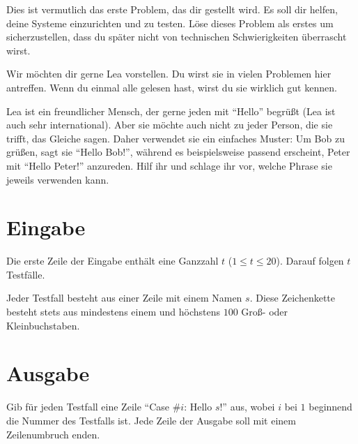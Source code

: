 

Dies ist vermutlich das erste Problem, das dir gestellt wird. Es soll dir helfen, deine Systeme einzurichten und zu testen. Löse dieses Problem als erstes um sicherzustellen, dass du später nicht von technischen Schwierigkeiten überrascht wirst.

Wir möchten dir gerne Lea vorstellen. Du wirst sie in vielen Problemen hier antreffen. Wenn du einmal alle gelesen hast, wirst du sie wirklich gut kennen.

Lea ist ein freundlicher Mensch, der gerne jeden mit ``Hello'' begrüßt (Lea ist auch sehr international). Aber sie möchte auch nicht zu jeder Person, die sie trifft, das Gleiche sagen. Daher verwendet sie ein einfaches Muster: Um Bob zu grüßen, sagt sie ``Hello Bob!'', während es beispielsweise passend erscheint, Peter mit ``Hello Peter!'' anzureden. Hilf ihr und schlage ihr vor, welche Phrase sie jeweils verwenden kann.

\section*{Eingabe}

Die erste Zeile der Eingabe enthält eine Ganzzahl $t$ ($1 \leq t \leq 20$). Darauf folgen $t$ Testfälle.

Jeder Testfall besteht aus einer Zeile mit einem Namen $s$. Diese Zeichenkette besteht stets aus mindestens einem und höchstens $100$ Groß- oder Kleinbuchstaben.

\section*{Ausgabe}

Gib für jeden Testfall eine Zeile ``Case \#$i$: Hello $s$!'' aus, wobei $i$ bei $1$ beginnend die Nummer des Testfalls ist. Jede Zeile der Ausgabe soll mit einem Zeilenumbruch enden.

